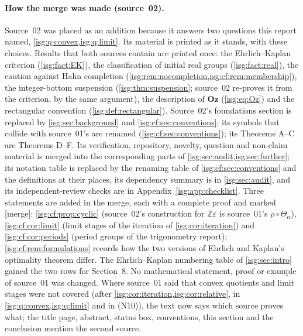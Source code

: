 \documentclass[11pt]{article}
\theoremstyle{definition}
\theoremstyle{remark}
\newcommand{\Oz}{\ensuremath{\mathbf{Oz}}}
\newcommand{\Z}{\mathbb{Z}}
\newcommand{\tht}{\Theta_{\alpha}}
\begin{document}
\paragraph{How the merge was made (source~02).} Source~02 was placed as an
addition because it answers two questions this report named,
\cref{isg:q:convex,isg:q:limit}. Its material is printed as it stands,
with these choices. Results that both sources contain are printed once:
the Ehrlich--Kaplan criterion (\cref{isg:fact:EK}), the classification of
initial real groups (\cref{isg:fact:real}), the caution against Hahn
completion (\cref{isg:rem:nocompletion,isg:cf:rem:membership}), the
integer-bottom suspension (\cref{isg:thm:suspension}; source~02 re-proves
it from the criterion, by the same argument), the description of $\Oz$
(\eqref{isg:eq:Oz}) and the rectangular convention
(\cref{isg:def:rectangular}). Source~02's foundations section is replaced
by \cref{isg:sec:background} and \cref{isg:cf:sec:conventions}; its
symbols that collide with source~01's are renamed
(\cref{isg:cf:sec:conventions}); its Theorems A--C are Theorems D--F. Its
verification, repository, novelty, question and non-claim material is
merged into the corresponding parts of
\cref{isg:sec:audit,isg:sec:further}; its notation table is replaced by
the renaming table of \cref{isg:cf:sec:conventions} and the definitions
at their places, its dependency summary is in \cref{isg:sec:audit}, and
its independent-review checks are in
Appendix~\ref{isg:app:checklist}. Three statements are added in the merge, each
with a complete proof and marked \textup{[merge]}:
\cref{isg:cf:prop:cyclic} (source~02's construction for $\Z\varepsilon$
is source~01's $\rho\circ\tht$), \cref{isg:cf:cor:limit} (limit stages of
the iteration of \cref{isg:cor:iteration}) and \cref{isg:cf:cor:periods}
(period groups of the trigonometry report); \cref{isg:cf:rem:formulations}
records how the two versions of Ehrlich and Kaplan's optimality theorem
differ. The Ehrlich--Kaplan numbering table of \cref{isg:sec:intro} gained
the two rows for Section~8. No mathematical statement, proof or example
of source~01 was changed. Where source~01 said that convex quotients and
limit stages were not covered (after
\cref{isg:cor:iteration,isg:cor:relative}, in
\cref{isg:q:convex,isg:q:limit} and in \textup{(N10)}), the text now says
which source proves what; the title page, abstract, status box,
conventions, this section and the conclusion mention the second source.
\end{document}
